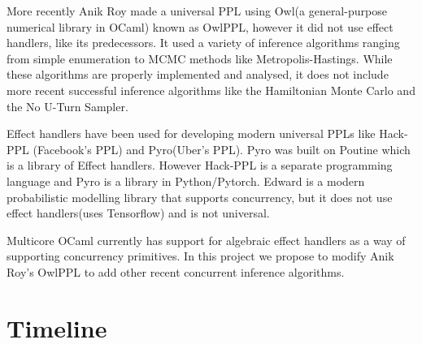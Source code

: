 \documentclass[12pt]{extarticle}
\begin{document}
More recently Anik Roy made a universal PPL using Owl\cite{wang2018owl}(a general-purpose numerical library in OCaml) known as OwlPPL\cite{roy2020probabilistic}, however it did not use effect handlers, like its predecessors. 
It used a variety of inference algorithms ranging from simple enumeration to MCMC methods like Metropolis-Hastings. 
 While these algorithms are properly implemented and analysed, it does not include more recent successful inference algorithms like the Hamiltonian Monte Carlo\cite{betancourt2018conceptual} and the No U-Turn Sampler\cite{hoffman2011nouturn}.  
 
 Effect handlers have been used for developing modern universal PPLs like Hack-PPL\cite{hack} (Facebook's PPL) and Pyro\cite{pyro}(Uber's PPL). Pyro was built on Poutine which is a library of Effect handlers. However Hack-PPL is a separate programming language and Pyro is a library in Python/Pytorch. Edward\cite{tran2017deep} is a modern probabilistic modelling library that supports concurrency, but it does not use effect handlers(uses Tensorflow) and is not universal.

 Multicore OCaml currently has support for algebraic effect handlers as a way of supporting concurrency primitives. In this project we propose to modify Anik Roy's OwlPPL to add other recent concurrent inference algorithms. 


\section*{Timeline}
\noindent
\end{document}
